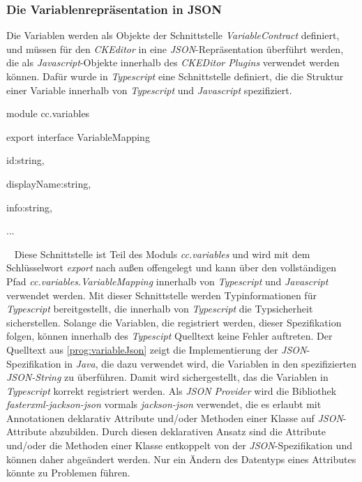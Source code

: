 \subsubsection{Die Variablenrepräsentation in JSON}
Die Variablen werden als Objekte der Schnittstelle \emph{VariableContract} definiert, und müssen für den \emph{CKEditor} in eine \emph{JSON}-Repräsentation überführt werden, die als \emph{Javascript}-Objekte innerhalb des \emph{CKEDitor Plugins} verwendet werden können. Dafür wurde in \emph{Typescript} eine Schnittstelle definiert, die die Struktur einer Variable innerhalb von \emph{Typescript} und \emph{Javascript} spezifiziert.
\begin{JsCode}[numbers=none]
module cc.variables {

    export interface VariableMapping {
    
        id:string,
        
        displayName:string,
        
        info:string,
    }
    
    ...
}
\end{JsCode}
\ \newline
Diese Schnittstelle ist Teil des Moduls \emph{cc.variables} und wird mit dem Schlüsselwort \emph{export} nach außen offengelegt und kann über den vollständigen Pfad \emph{cc.variables.VariableMapping} innerhalb von \emph{Typescript} und \emph{Javascript} verwendet werden. Mit dieser Schnittstelle werden Typinformationen für \emph{Typescript} bereitgestellt, die innerhalb von \emph{Typescript} die Typsicherheit sicherstellen. Solange die Variablen, die registriert werden, dieser Spezifikation folgen, können innerhalb des \emph{Typescipt} Quelltext keine Fehler auftreten.
\newline
\newline
Der Quelltext aus \ref{prog:variableJson} zeigt die Implementierung der \emph{JSON}-Spezifikation in \emph{Java}, die dazu verwendet wird, die Variablen in den spezifizierten \emph{JSON-String} zu überführen. Damit wird sichergestellt, das die Variablen in \emph{Typescript} korrekt registriert werden. Als \emph{JSON Provider} wird die Bibliothek \emph{fasterxml-jackson-json} vormals \emph{jackson-json} verwendet, die es erlaubt mit Annotationen deklarativ Attribute und/oder Methoden einer Klasse auf \emph{JSON}-Attribute abzubilden. Durch diesen deklarativen Ansatz sind die Attribute und/oder die Methoden einer Klasse entkoppelt von der \emph{JSON}-Spezifikation und können daher abgeändert werden. Nur ein Ändern des Datentyps eines Attributes könnte zu Problemen führen. 
